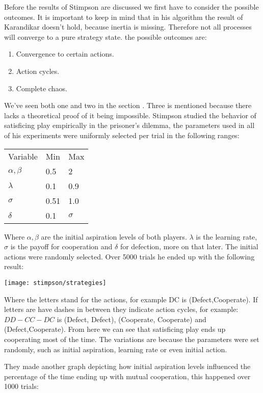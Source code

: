 \cleared Before the results of Stimpson are discussed we first have to consider
the possible outcomes. It is important to keep in mind that in his algorithm
the result of Karandikar doesn't hold, because inertia is missing. Therefore
not all processes will converge to a pure strategy state.
the possible outcomes are:
\begin{enumerate}
  \item Convergence to certain actions.
  \item Action cycles.
  \item Complete chaos.
\end{enumerate}
\cleared We've seen both one and two in the section . Three
is mentioned because there lacks a theoretical proof of it being impossible.
Stimpson studied the behavior of satisficing play empirically in the prisoner's
dilemma, the parameters used in all of his experiments were 
uniformly selected per trial in the following ranges:

\begin{tabular}{lll}
  Variable & Min & Max \\
  $\alpha, \beta$ & 0.5 & 2  \\
  $\lambda$ & 0.1 & 0.9  \\
  $\sigma$ & 0.51 & 1.0  \\
  $\delta$ & 0.1 & $\sigma$
\end{tabular}

Where $\alpha, \beta$ are the initial aspiration levels of both players.
$\lambda$ is the learning rate, $\sigma$ is the payoff for cooperation and
$\delta$ for defection, more on that later.
The initial actions were randomly selected.
Over 5000 trials he ended up with the following result:

\noindent
\texttt{[image: stimpson/strategies]}

\cleared Where the letters stand for the actions, for example DC is (Defect,Cooperate).
If letters are have dashes in between they indicate action cycles, for example:
$DD-CC-DC$ is (Defect, Defect), (Cooperate, Cooperate) and 
(Defect,Cooperate).
From here we can see that satisficing play ends up cooperating most of the time.
The variations are because the parameters were set randomly, such as initial
aspiration, learning rate or even initial action.

\cleared They made another graph depicting how initial aspiration levels
influenced the percentage of the time ending up with mutual cooperation,
this happened over 1000 trials:

